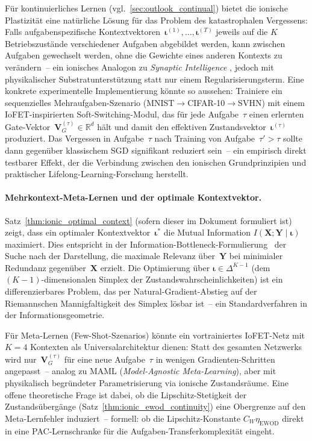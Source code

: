 \documentclass[12pt, a4paper, openany]{report}
\begin{document}
Für kontinuierliches Lernen (vgl.~\cref{sec:outlook_continual}) bietet die
ionische Plastizität eine natürliche Lösung für das Problem des katastrophalen
Vergessens: Falls aufgabenspezifische Kontextvektoren~$\bm{\iota}^{(1)}, \ldots,
\bm{\iota}^{(T)}$ jeweils auf die $K$ Betriebszustände verschiedener
Aufgaben abgebildet werden, kann zwischen Aufgaben gewechselt werden, ohne
die Gewichte eines anderen Kontexts zu verändern~-- ein ionisches Analogon
zu \emph{Synaptic Intelligence} \cite{zenke17}, jedoch mit physikalischer
Substratunterstützung statt nur einem Regularisierungsterm.
Eine konkrete experimentelle Implementierung könnte so aussehen: Trainiere
ein sequenzielles Mehraufgaben-Szenario (MNIST$\to$CIFAR-10$\to$SVHN) mit
einem IoFET-inspirierten Soft-Switching-Modul, das für jede Aufgabe~$\tau$
einen erlernten Gate-Vektor~$\mathbf{V}_G^{(\tau)} \in \mathbb{R}^d$ hält
und damit den effektiven Zustandsvektor~$\bm{\iota}^{(\tau)}$ produziert.
Das Vergessen in Aufgabe~$\tau$ nach Training von Aufgabe~$\tau'>\tau$ sollte
dann gegenüber klassischem SGD signifikant reduziert sein~-- ein empirisch
direkt testbarer Effekt, der die Verbindung zwischen den
ionischen Grundprinzipien und praktischer Lifelong-Learning-Forschung herstellt.

\paragraph{Mehrkontext-Meta-Lernen und der optimale Kontextvektor.}
Satz~\ref{thm:ionic_optimal_context} (sofern dieser im Dokument formuliert
ist) zeigt, dass ein optimaler Kontextvektor~$\bm{\iota}^*$
die Mutual Information $I(\bm{X};\bm{Y} \mid \bm{\iota})$ maximiert.  Dies
entspricht in der Information-Bottleneck-Formulierung~\cite{tishby15} der
Suche nach der Darstellung, die maximale Relevanz über~$\bm{Y}$ bei
minimialer Redundanz gegenüber~$\bm{X}$ erzielt.  Die Optimierung über
$\bm{\iota} \in \Delta^{K-1}$ (dem $(K-1)$-dimensionalen Simplex der
Zustandswahrscheinlichkeiten) ist ein differenzierbares Problem, das
per Natural-Gradient-Abstieg auf der Riemannschen Mannigfaltigkeit des
Simplex lösbar ist~-- ein Standardverfahren in der Informationsgeometrie.

Für Meta-Lernen (Few-Shot-Szenarios) könnte ein vortrainiertes IoFET-Netz
mit $K=4$ Kontexten als Universalarchitektur dienen: Statt des gesamten
Netzwerks wird nur~$\bm{V}_G^{(\tau)}$ für eine neue Aufgabe~$\tau$
in wenigen Gradienten-Schritten angepasst~-- analog zu MAML
(\textit{Model-Agnostic Meta-Learning}), aber mit physikalisch begründeter
Parametrisierung via ionische Zustandsräume.  Eine offene
theoretische Frage ist dabei, ob die Lipschitz-Stetigkeit der
Zustandsübergänge (Satz~\ref{thm:ionic_ewod_continuity}) eine Obergrenze
auf den Meta-Lernfehler induziert~-- formell: ob die Lipschitz-Konstante
$C_W \eta_{\text{EWOD}}$ direkt in eine PAC-Lernschranke für die
Aufgaben-Transferkomplexität eingeht.
\end{document}
